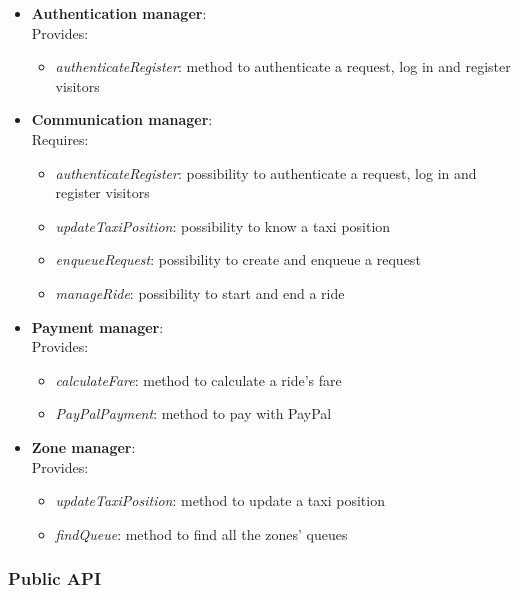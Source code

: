 \begin{itemize}
\item \textbf{Authentication manager}:\\ 
Provides:
\begin{itemize}
\item \textit{authenticateRegister}: method to authenticate a request, log in and register visitors
\end{itemize}

\item \textbf{Communication manager}:\\
Requires:
\begin{itemize}
\item \textit{authenticateRegister}: possibility to authenticate a request, log in and register visitors
\item \textit{updateTaxiPosition}: possibility to know a taxi position
\item \textit{enqueueRequest}: possibility to create and enqueue a request
\item \textit{manageRide}: possibility to start and end a ride
\end{itemize}

\item \textbf{Payment manager}:\\
Provides:
\begin{itemize}
\item \textit{calculateFare}: method to calculate a ride's fare
\item \textit{PayPalPayment}: method to pay with PayPal
\end{itemize}

\item \textbf{Zone manager}:\\
Provides:
\begin{itemize}
\item \textit{updateTaxiPosition}: method to update a taxi position
\item \textit{findQueue}: method to find all the zones' queues
\end{itemize}

\end{itemize}

\subsubsection{Public API}

